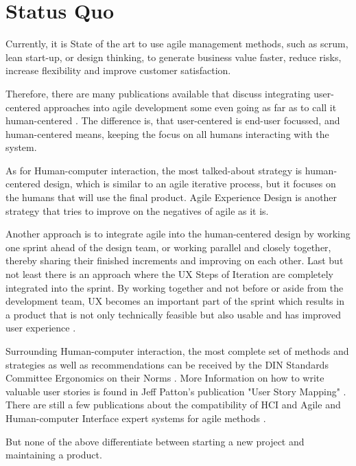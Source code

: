 \section*{Status Quo}

Currently, it is State of the art to use agile management methods, such as scrum, lean start-up, or design thinking, to generate business value faster, reduce risks, increase flexibility and improve customer satisfaction. 

Therefore, there are many publications available that discuss integrating user-centered approaches into agile development \citep{PDFAnAgi97:online, HowtoCom22:online} some even going as far as to call it human-centered \citep{HumanCen72:online, Forbrig2015ManagingTA, Agilehum49:online}. The difference is, that user-centered is end-user focussed, and human-centered means, keeping the focus on all humans interacting with the system.

As for Human-computer interaction, the most talked-about strategy is human-centered design, which is similar to an agile iterative process, but it focuses on the humans that will use the final product. Agile Experience Design \citep{ratcliffe2011agile:main} is another strategy that tries to improve on the negatives of agile as it is.

Another approach is to integrate agile into the human-centered design by working one sprint ahead of the design team, or working parallel and closely together, thereby sharing their finished increments and improving on each other. Last but not least there is an approach where the UX Steps of Iteration are completely integrated into the sprint. By working together and not before or aside from the development team, UX becomes an important part of the sprint which results in a product that is not only technically feasible but also usable and has improved user experience \citep{Bringing52:online}.

Surrounding Human-computer interaction, the most complete set of methods and strategies as well as recommendations can be received by the DIN Standards Committee Ergonomics on their Norms \citep{dinEnIso9241:110, dinEnIso9241:210, dinEnIso9241:220}. More Information on how to write valuable user stories is found in Jeff Patton's publication "User Story Mapping" \citep{pattonUserStory}. There are still a few publications about the compatibility of HCI and Agile \citep{HumanCom2:online} and Human-computer Interface expert systems for agile methods \citep{Humancom0:online}.

But none of the above differentiate between starting a new project and maintaining a product. 